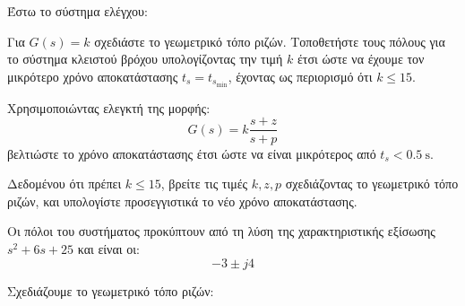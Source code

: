 \documentclass[11pt,a4paper,notitlepage,fleqn,final]{article}
\begin{document}
\begin{exercise}
Έστω το σύστημα ελέγχου:


\begin{enumlatin}
	\item Για \( G(s) = k \) σχεδιάστε το γεωμετρικό τόπο ριζών. Τοποθετήστε τους πόλους
	για το σύστημα κλειστού βρόχου υπολογίζοντας την τιμή \( k \) έτσι ώστε να έχουμε
	τον μικρότερο χρόνο αποκατάστασης \( t_s = t_{s_{\min}} \), έχοντας ως περιορισμό
	ότι \( k \leq 15 \).
	\item Χρησιμοποιώντας ελεγκτή της μορφής:
	\[
	G(s) = k\frac{s+z}{s+p}
	\]
	βελτιώστε το χρόνο αποκατάστασης έτσι ώστε να είναι μικρότερος από \( t_s < \SI{0.5}{\second} \).
	
	Δεδομένου ότι πρέπει \( k \leq 15 \), βρείτε τις τιμές \( k,z,p  \) σχεδιάζοντας το
	γεωμετρικό τόπο ριζών, και υπολογίστε προσεγγιστικά το νέο χρόνο αποκατάστασης.
\end{enumlatin}

\tcblower
\begin{enumlatin}
	\item
Οι πόλοι του συστήματος προκύπτουν από τη λύση της χαρακτηριστικής εξίσωσης \( s^2+6s+25 \)
και είναι οι:
\[
-3\pm j4
\]

Σχεδιάζουμε το γεωμετρικό τόπο ριζών:

\end{enumlatin}
\end{exercise}
\end{document}
